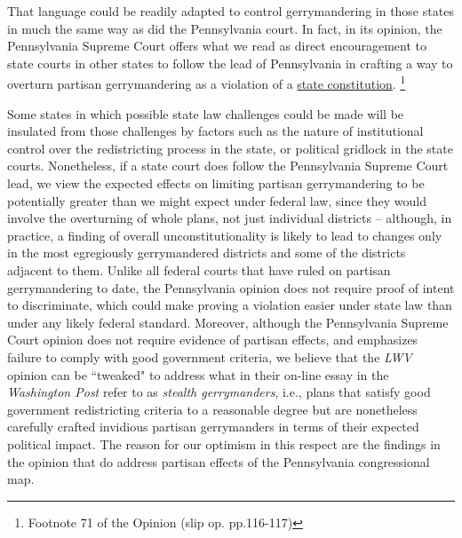     That language could be readily adapted to control gerrymandering in those states in much the same way as did the Pennsylvania court. In fact, in its opinion, the Pennsylvania Supreme Court offers what we read as direct encouragement to state courts in other states to follow the lead of Pennsylvania in crafting a way to overturn partisan gerrymandering as a violation of a \underline{state constitution}.
        \footnote{Footnote 71 of the Opinion (slip op. pp.116-117)}
\par
    Some states in which possible state law challenges could be made will be insulated from those challenges by factors such as the nature of institutional control over the redistricting process in the state, or political gridlock in the state courts. Nonetheless, if a state court does follow the Pennsylvania Supreme Court lead, we view the expected effects on limiting partisan gerrymandering to be potentially greater than we might expect under federal law, since they would involve the overturning of whole plans, not just individual districts -- although, in practice, a finding of overall unconstitutionality is likely to lead to changes only in the most egregiously gerrymandered districts and some of the districts adjacent to them. Unlike all federal courts that have ruled on partisan gerrymandering to date, the Pennsylvania opinion does not require proof of intent to discriminate, which could make proving a violation easier under state law than under any likely federal standard. Moreover, although the Pennsylvania Supreme Court opinion does not require evidence of partisan effects, and emphasizes failure to comply with good government criteria, we believe that the \textit{LWV} opinion can be ``tweaked" to address what \citet[][see also \citep{Grofman_Cervas_2018_ELJ}]{GrofmanCervas2018_WashPo} in their on-line essay in the \textit{Washington Post} refer to as \textit{stealth gerrymanders}, i.e., plans that satisfy good government redistricting criteria to a reasonable degree but are nonetheless carefully crafted invidious partisan gerrymanders in terms of their expected political impact. The reason for our optimism in this respect are the findings in the opinion that do address partisan effects of the Pennsylvania congressional map. 
